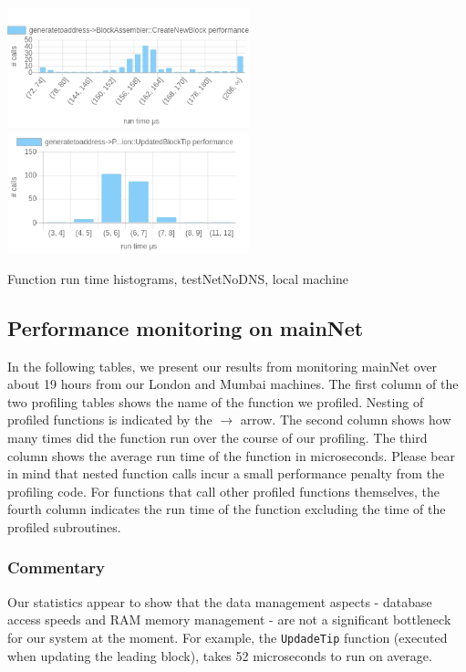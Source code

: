 \documentclass{article}
\begin{document}
\begin{table}
	\includegraphics[width=7cm]{images/local/chartgeneratetoaddress-_3EBlockAssembler_3A_3ACreateNewBlock.png}
	\includegraphics[width=7cm]{images/local/chartgeneratetoaddress-_3EPeerLogicValidation_3A_3AUpdatedBlockTip.png}
	
	
	\caption{Function run time histograms, testNetNoDNS, local machine}
\end{table}

\subsection{Performance monitoring on mainNet}
In the following tables, we present our results from monitoring mainNet over about 19 hours from our London and Mumbai machines. The first column of the two profiling tables shows the name of the function we profiled. Nesting of profiled functions is indicated by the $ \to $ arrow. The second column shows how many times did the function run over the course of our profiling. The third column shows the average run time of the function in microseconds. Please bear in mind that nested function calls incur a small performance penalty from the profiling code. For functions that call other profiled functions themselves, the fourth column indicates the run time of the function excluding the time of the profiled subroutines.


\subsubsection{Commentary}
Our statistics appear to show that the data management aspects - database access speeds and RAM memory management - are not a significant bottleneck for our system at the moment. For example, the \verb|UpdadeTip| function (executed when updating the leading block), takes 52 microseconds to run on average.
\end{document}
